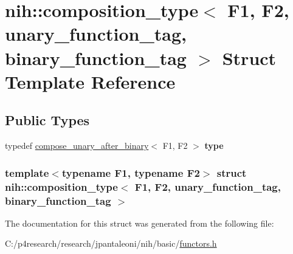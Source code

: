 \hypertarget{structnih_1_1composition__type_3_01_f1_00_01_f2_00_01unary__function__tag_00_01binary__function__tag_01_4}{
\section{nih\-:\-:composition\-\_\-type$<$ \-F1, \-F2, unary\-\_\-function\-\_\-tag, binary\-\_\-function\-\_\-tag $>$ \-Struct \-Template \-Reference}
\label{structnih_1_1composition__type_3_01_f1_00_01_f2_00_01unary__function__tag_00_01binary__function__tag_01_4}
}
\subsection*{\-Public \-Types}
\begin{DoxyCompactItemize}
\item 
\hypertarget{structnih_1_1composition__type_3_01_f1_00_01_f2_00_01unary__function__tag_00_01binary__function__tag_01_4_aa60555af0cb5462e070174c9fd563d00}{
typedef \*
\hyperlink{structnih_1_1compose__unary__after__binary}{compose\-\_\-unary\-\_\-after\-\_\-binary}$<$ \-F1, \*
\-F2 $>$ {\bfseries type}}
\label{structnih_1_1composition__type_3_01_f1_00_01_f2_00_01unary__function__tag_00_01binary__function__tag_01_4_aa60555af0cb5462e070174c9fd563d00}

\end{DoxyCompactItemize}
\subsubsection*{template$<$typename F1, typename F2$>$ struct nih\-::composition\-\_\-type$<$ F1, F2, unary\-\_\-function\-\_\-tag, binary\-\_\-function\-\_\-tag $>$}



\-The documentation for this struct was generated from the following file\-:\begin{DoxyCompactItemize}
\item 
\-C\-:/p4research/research/jpantaleoni/nih/basic/\hyperlink{functors_8h}{functors.\-h}\end{DoxyCompactItemize}
